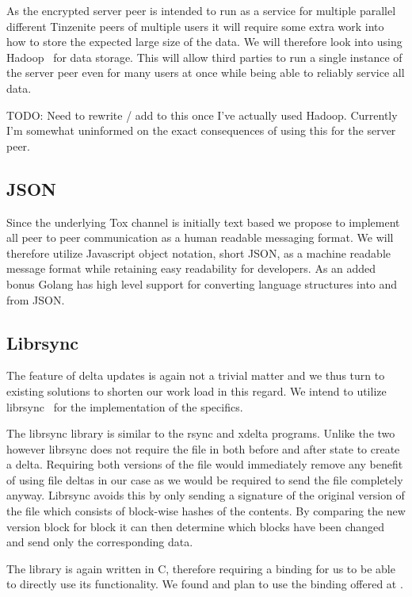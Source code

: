 As the encrypted server peer is intended to run as a service for multiple parallel different Tinzenite peers of multiple users it will require some extra work into how to store the expected large size of the data.
We will therefore look into using Hadoop~\cite{web:site:hadoop} for data storage.
This will allow third parties to run a single instance of the server peer even for many users at once while being able to reliably service all data.

TODO: Need to rewrite / add to this once I've actually used Hadoop.
Currently I'm somewhat uninformed on the exact consequences of using this for the server peer.

\subsection{JSON}

Since the underlying Tox channel is initially text based we propose to implement all peer to peer communication as a human readable messaging format.
We will therefore utilize Javascript object notation, short JSON, as a machine readable message format while retaining easy readability for developers.
As an added bonus Golang has high level support for converting language structures into and from JSON.

\subsection{Librsync}

The feature of delta updates is again not a trivial matter and we thus turn to existing solutions to shorten our work load in this regard.
We intend to utilize librsync~\cite{web:site:librsync} for the implementation of the specifics.

The librsync library is similar to the rsync and xdelta programs.
Unlike the two however librsync does not require the file in both before and after state to create a delta.
Requiring both versions of the file would immediately remove any benefit of using file deltas in our case as we would be required to send the file completely anyway.
Librsync avoids this by only sending a signature of the original version of the file which consists of block-wise hashes of the contents.
By comparing the new version block for block it can then determine which blocks have been changed and send only the corresponding data.

The library is again written in C, therefore requiring a binding for us to be able to directly use its functionality.
We found and plan to use the binding offered at \cite{web:site:librsync:golang}.

